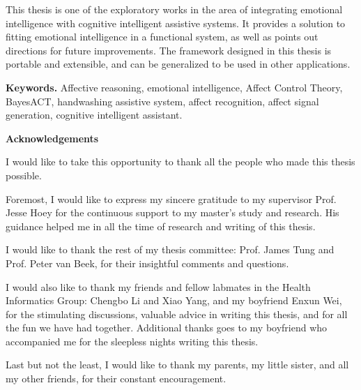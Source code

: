 This thesis is one of the exploratory works in the area of integrating emotional intelligence with cognitive intelligent assistive systems. It provides a solution to fitting emotional intelligence in a functional system, as well as points out directions for future improvements. The framework designed in this thesis is portable and extensible, and can be generalized to be used in other applications.

\vskip 1cm
\noindent\textbf{Keywords.} Affective reasoning, emotional intelligence, Affect Control Theory, BayesACT, handwashing assistive system, affect recognition, affect signal generation, cognitive intelligent assistant.

\cleardoublepage


\begin{center}\textbf{Acknowledgements}\end{center}

I would like to take this opportunity to thank all the people who made this thesis possible.

Foremost, I would like to express my sincere gratitude to my supervisor Prof. Jesse Hoey for the continuous support to my master's study and research. His guidance helped me in all the time of research and writing of this thesis. 

I would like to thank the rest of my thesis committee: Prof. James Tung and Prof. Peter van Beek, for their insightful comments and questions.

I would also like to thank my friends and fellow labmates in the Health Informatics Group: Chengbo Li and Xiao Yang, and my boyfriend Enxun Wei, for the stimulating discussions, valuable advice in writing this thesis, and for all the fun we have had together. Additional thanks goes to my boyfriend who accompanied me for the sleepless nights writing this thesis.

Last but not the least, I would like to thank my parents, my little sister, and all my other friends, for their constant encouragement.

\cleardoublepage



